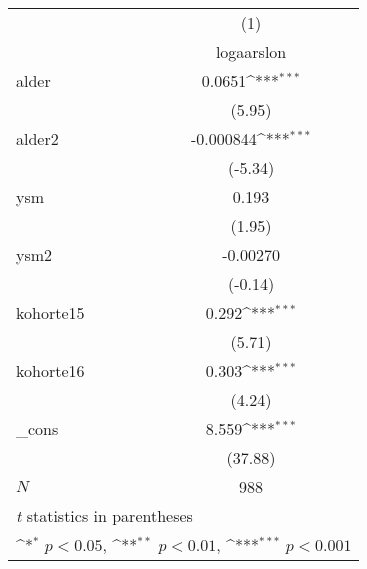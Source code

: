 {
\def\sym#1{\ifmmode^{#1}\else\(^{#1}\)\fi}
\begin{tabular}{l*{1}{c}}
\hline\hline
            &\multicolumn{1}{c}{(1)}\\
            &\multicolumn{1}{c}{logaarslon}\\
\hline
alder       &      0.0651\sym{***}\\
            &      (5.95)         \\
[1em]
alder2      &   -0.000844\sym{***}\\
            &     (-5.34)         \\
[1em]
ysm         &       0.193         \\
            &      (1.95)         \\
[1em]
ysm2        &    -0.00270         \\
            &     (-0.14)         \\
[1em]
kohorte15   &       0.292\sym{***}\\
            &      (5.71)         \\
[1em]
kohorte16   &       0.303\sym{***}\\
            &      (4.24)         \\
[1em]
\_cons      &       8.559\sym{***}\\
            &     (37.88)         \\
\hline
\(N\)       &         988         \\
\hline\hline
\multicolumn{2}{l}{\footnotesize \textit{t} statistics in parentheses}\\
\multicolumn{2}{l}{\footnotesize \sym{*} \(p<0.05\), \sym{**} \(p<0.01\), \sym{***} \(p<0.001\)}\\
\end{tabular}
}
